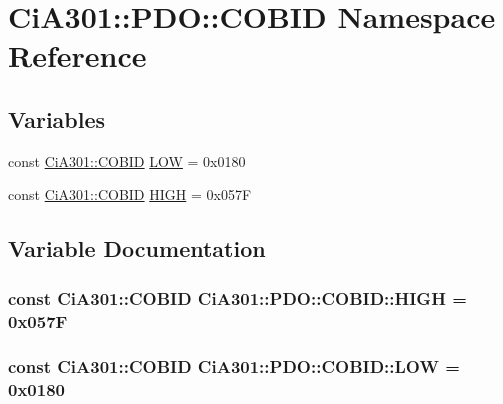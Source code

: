 \hypertarget{namespace_ci_a301_1_1_p_d_o_1_1_c_o_b_i_d}{}\section{Ci\+A301\+:\+:P\+D\+O\+:\+:C\+O\+B\+I\+D Namespace Reference}
\label{namespace_ci_a301_1_1_p_d_o_1_1_c_o_b_i_d}
\subsection*{Variables}
\begin{DoxyCompactItemize}
\item 
const \hyperlink{namespace_ci_a301_aec5b5dbb2b60d2837c60499f6f297aa7}{Ci\+A301\+::\+C\+O\+B\+I\+D} \hyperlink{namespace_ci_a301_1_1_p_d_o_1_1_c_o_b_i_d_ae0bf8a0a5e40108893af04e8037be329}{L\+O\+W} = 0x0180
\item 
const \hyperlink{namespace_ci_a301_aec5b5dbb2b60d2837c60499f6f297aa7}{Ci\+A301\+::\+C\+O\+B\+I\+D} \hyperlink{namespace_ci_a301_1_1_p_d_o_1_1_c_o_b_i_d_a026539b60cd9df7c6eb9f5492faaeaa1}{H\+I\+G\+H} = 0x057\+F
\end{DoxyCompactItemize}


\subsection{Variable Documentation}
\hypertarget{namespace_ci_a301_1_1_p_d_o_1_1_c_o_b_i_d_a026539b60cd9df7c6eb9f5492faaeaa1}{}
\subsubsection[{H\+I\+G\+H}]{\setlength{\rightskip}{0pt plus 5cm}const {\bf Ci\+A301\+::\+C\+O\+B\+I\+D} Ci\+A301\+::\+P\+D\+O\+::\+C\+O\+B\+I\+D\+::\+H\+I\+G\+H = 0x057\+F}\label{namespace_ci_a301_1_1_p_d_o_1_1_c_o_b_i_d_a026539b60cd9df7c6eb9f5492faaeaa1}
\hypertarget{namespace_ci_a301_1_1_p_d_o_1_1_c_o_b_i_d_ae0bf8a0a5e40108893af04e8037be329}{}
\subsubsection[{L\+O\+W}]{\setlength{\rightskip}{0pt plus 5cm}const {\bf Ci\+A301\+::\+C\+O\+B\+I\+D} Ci\+A301\+::\+P\+D\+O\+::\+C\+O\+B\+I\+D\+::\+L\+O\+W = 0x0180}\label{namespace_ci_a301_1_1_p_d_o_1_1_c_o_b_i_d_ae0bf8a0a5e40108893af04e8037be329}
